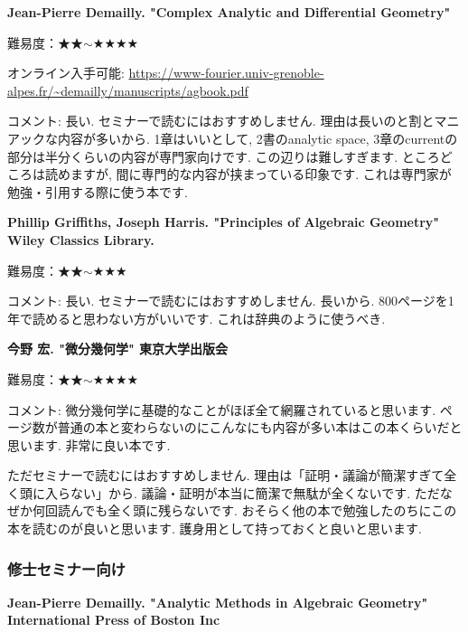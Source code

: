 \textbf{Jean-Pierre Demailly. "Complex Analytic and Differential Geometry"} \vspace{-6pt}

難易度：★★$\sim$★★★★  \vspace{-6pt}

オンライン入手可能: \url{https://www-fourier.univ-grenoble-alpes.fr/~demailly/manuscripts/agbook.pdf}\vspace{-6pt}

コメント: 長い. セミナーで読むにはおすすめしません. 理由は長いのと割とマニアックな内容が多いから. 1章はいいとして, 2書のanalytic space, 3章のcurrentの部分は半分くらいの内容が専門家向けです. この辺りは難しすぎます. ところどころは読めますが, 間に専門的な内容が挟まっている印象です. これは専門家が勉強・引用する際に使う本です. 
\vspace{8pt}

\textbf{Phillip Griffiths, Joseph Harris. "Principles of Algebraic Geometry" Wiley Classics Library.}  \vspace{-6pt}

難易度：★★$\sim$★★★ \vspace{-6pt} 

コメント: 長い. セミナーで読むにはおすすめしません. 長いから. 800ページを1年で読めると思わない方がいいです. これは辞典のように使うべき. 
\vspace{8pt}

\textbf{今野 宏. "微分幾何学" 東京大学出版会}  \vspace{-6pt}

難易度：★★$\sim$★★★★ \vspace{-6pt} 

コメント: 微分幾何学に基礎的なことがほぼ全て網羅されていると思います. ページ数が普通の本と変わらないのにこんなにも内容が多い本はこの本くらいだと思います. 非常に良い本です. 

ただセミナーで読むにはおすすめしません. 理由は「証明・議論が簡潔すぎて全く頭に入らない」から.  議論・証明が本当に簡潔で無駄が全くないです. ただなぜか何回読んでも全く頭に残らないです. おそらく他の本で勉強したのちにこの本を読むのが良いと思います. 護身用として持っておくと良いと思います. 

\subsubsection{修士セミナー向け}

\textbf{Jean-Pierre Demailly. "Analytic Methods in Algebraic Geometry"  International Press of Boston Inc} \vspace{-6pt}

